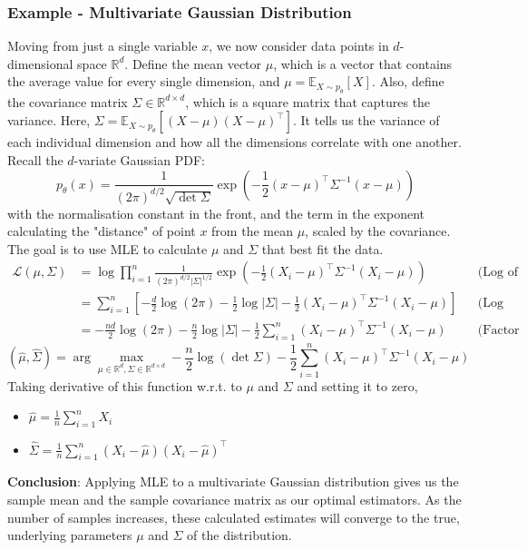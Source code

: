 \documentclass[../Probability.tex]{subfiles}
\begin{document}
\subsubsection{Example - Multivariate Gaussian Distribution}
Moving from just a single variable $x$, we now consider data points in $d$-dimensional space $\mathbb{R}^d$.\newline
Define the mean vector $\mu$, which is a vector that contains the average value for every single dimension, and $\mu = \mathbb{E}_{X \sim p_\theta}[X]$.\newline
Also, define the covariance matrix $\Sigma \in \mathbb{R}^{d \times d}$, which is a square matrix that captures the variance. Here, $\Sigma = \mathbb{E}_{X \sim p_\theta}[(X - \mu)(X - \mu)^\top]$.
It tells us the variance of each individual dimension and how all the dimensions correlate with one another.\newline
Recall the $d$-variate Gaussian PDF:
\[p_\theta(x) = \frac{1}{(2\pi)^{d/2}\sqrt{\det \Sigma}} \exp\left(-\frac{1}{2}(x - \mu)^\top \Sigma^{-1} (x - \mu)\right)\]
with the normalisation constant in the front, and the term in the exponent calculating the "distance" of point $x$ from the mean $\mu$, scaled by the covariance.\newline
The goal is to use MLE to calculate $\mu$ and $\Sigma$ that best fit the data.\newline
\begin{align*}
\mathcal{L}(\mu, \Sigma) &= \log \prod_{i=1}^{n} \frac{1}{(2\pi)^{d/2} |\Sigma|^{1/2}} \exp\left(-\frac{1}{2}(X_i - \mu)^\top \Sigma^{-1} (X_i - \mu)\right) && \text{(Log of the joint PDF)} \\
&= \sum_{i=1}^{n} \left[ -\frac{d}{2}\log(2\pi) - \frac{1}{2}\log|\Sigma| - \frac{1}{2}(X_i - \mu)^\top \Sigma^{-1} (X_i - \mu) \right] && \text{(Log rules: product to sum)} \\
&= -\frac{nd}{2}\log(2\pi) - \frac{n}{2}\log|\Sigma| - \frac{1}{2}\sum_{i=1}^{n} (X_i - \mu)^\top \Sigma^{-1} (X_i - \mu) && \text{(Factor constants out of sum)}
\end{align*}
$$(\hat{\mu}, \hat{\Sigma}) = \arg\max_{\mu \in \mathbb{R}^d, \Sigma \in \mathbb{R}^{d \times d}} -\frac{n}{2}\log(\det\Sigma) - \frac{1}{2}\sum_{i=1}^{n}(X_i - \mu)^\top\Sigma^{-1}(X_i - \mu)$$
Taking derivative of this function w.r.t. to $\mu$ and $\Sigma$ and setting it to zero,
\begin{itemize}
    \item $\hat{\mu} = \frac{1}{n}\sum_{i=1}^{n}X_i$
    \item $\hat{\Sigma} = \frac{1}{n}\sum_{i=1}^{n}(X_i - \hat{\mu})(X_i - \hat{\mu})^\top$
\end{itemize}
\textbf{Conclusion}: Applying MLE to a multivariate Gaussian distribution gives us the sample mean and the sample covariance matrix as our optimal estimators.
As the number of samples increases, these calculated estimates will converge to the true, underlying parameters $\mu$ and $\Sigma$ of the distribution.
\end{document}
